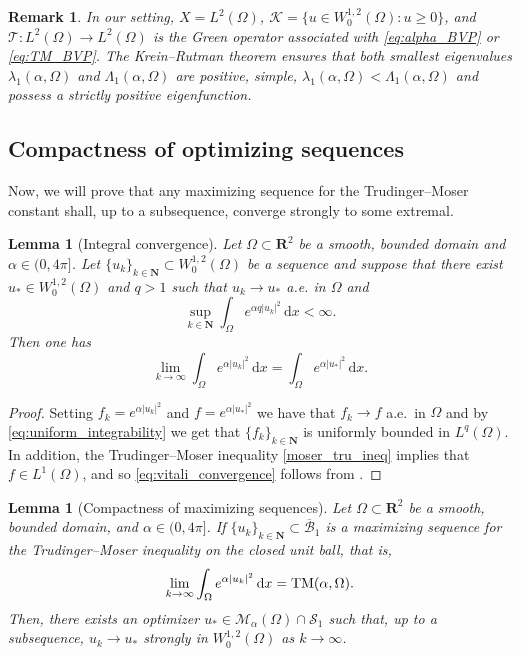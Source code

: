 \documentclass[reqno,11pt]{amsart}
\newtheorem{lemma}[theorem]{Lemma}
\newtheorem{remark}[theorem]{Remark}
\theoremstyle{definition}
\newcommand{\ud}{\,\mathrm{d}}
\newcommand{\N}{\mathbf{N}}
\begin{document}
\begin{remark}
In our setting, $X=L^2(\Omega)$, $\mathcal{K}=\{u\in W^{1,2}_0(\Omega) : u\ge0\}$, and
$\mathscr{T}:L^2(\Omega)\to L^2(\Omega)$ is the Green operator associated with
\eqref{eq:alpha_BVP} or \eqref{eq:TM_BVP}.  
The Krein--Rutman theorem ensures that
both smallest eigenvalues $\lambda_1(\alpha,\Omega)$ and $\Lambda_1(\alpha,\Omega)$
are positive,  simple, $\lambda_1(\alpha,\Omega)< \Lambda_1(\alpha,\Omega)$ and possess 
a strictly positive eigenfunction.
\end{remark}

\subsection{Compactness of optimizing sequences}
Now, we will prove that any maximizing sequence for the Trudinger--Moser constant shall, up to a 
subsequence, converge strongly to some extremal.
	\begin{lemma}[Integral convergence]\label{lm:vitali_convergence}
        Let $\Omega\subset\mathbf{R}^2$ be a smooth, bounded domain and $\alpha\in (0,4\pi]$.
       Let $\{u_k\}_{k\in\mathbf{N}} \subset W^{1,2}_0(\Omega)$ be a sequence and suppose that 
       there exist $u_*\in W^{1,2}_0(\Omega)$ and $q>1$ such that $u_k \rightarrow u_*$ a.e. in $\Omega$ and
        \begin{equation}\label{eq:uniform_integrability}
         \sup_{k\in\mathbf{N}}\int_{\Omega} e^{\alpha q {|u_k|}^{2}} \ud x <\infty.
        \end{equation}
		Then one has
		\begin{equation}\label{eq:vitali_convergence}
			\lim_{k\rightarrow \infty}\int_{\Omega} e^{\alpha  {|u_k|}^{2}} 
            \ud x= \int_{\Omega} e^{\alpha  {|u_*|}^{2}} \ud x.
		\end{equation}	
	\end{lemma}

    \begin{proof} Setting $f_k=e^{\alpha |u_k|^2}$ and $f=e^{\alpha  {|u_*|}^{2}}$ we have 
that $f_k \to f$ a.e.\ in $\Omega$ and by \eqref{eq:uniform_integrability} we get that 
$\{f_k\}_{k\in\N}$ is uniformly bounded in $L^q (\Omega)$. In addition, the Trudinger--Moser 
inequality \eqref{moser_tru_ineq} implies that $f\in L^1(\Omega)$, and 
so \eqref{eq:vitali_convergence} follows from \cite[Lemma~3.2]{LuLu2020}. 
    \end{proof}    
	\begin{lemma}[Compactness of maximizing sequences]\label{lm:compactness}
		Let $\Omega\subset\mathbf{R}^2$ be a smooth, bounded domain, and $\alpha\in (0,4\pi]$.
        If $\{u_k\}_{k\in\mathbf{N}} \subset  \overline{\mathcal{B}}_1$ is a maximizing sequence 
        for the Trudinger--Moser inequality on the closed unit ball, that is, 
        \[
        \lim_{k\rightarrow \infty}\int_{\Omega} e^{\alpha  {|u_k|}^{2}} \ud x={\rm TM}({\alpha},\Omega).
        \]
        Then, there exists an optimizer $u_*\in \mathcal{M}_\alpha(\Omega)\cap \mathcal{S}_1$ such that, 
        up to a subsequence, $u_k \rightarrow u_*$ strongly in $W^{1,2}_0(\Omega)$ as $k\to\infty$. 
	\end{lemma}
    
\end{document}
